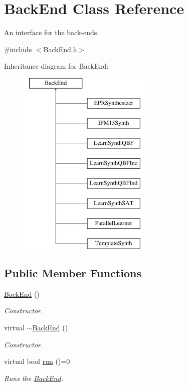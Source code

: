 \hypertarget{classBackEnd}{\section{Back\-End Class Reference}
\label{classBackEnd}
}


An interface for the back-\/ends.  




{\ttfamily \#include $<$Back\-End.\-h$>$}

Inheritance diagram for Back\-End\-:\begin{figure}[H]
\begin{center}
\leavevmode
\includegraphics[height=9.000000cm]{classBackEnd}
\end{center}
\end{figure}
\subsection*{Public Member Functions}
\begin{DoxyCompactItemize}
\item 
\hyperlink{classBackEnd_afc7f71992574b71328373706917f2613}{Back\-End} ()
\begin{DoxyCompactList}\small\item\em Constructor. \end{DoxyCompactList}\item 
virtual \hyperlink{classBackEnd_ae54727f91644af02dc148eb820ae33c4}{$\sim$\-Back\-End} ()
\begin{DoxyCompactList}\small\item\em Constructor. \end{DoxyCompactList}\item 
virtual bool \hyperlink{classBackEnd_a099e717dc71e9cc2d838b1ca86340590}{run} ()=0
\begin{DoxyCompactList}\small\item\em Runs the \hyperlink{classBackEnd}{Back\-End}. \end{DoxyCompactList}\end{DoxyCompactItemize}
